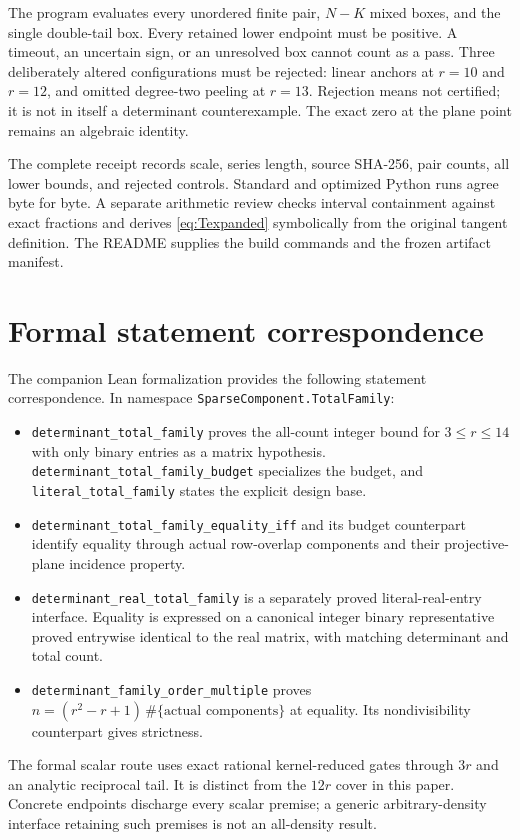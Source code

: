 \documentclass[11pt]{article}
\theoremstyle{remark}
\begin{document}
The program evaluates every unordered finite pair, $N-K$ mixed boxes, and
the single double-tail box. Every retained lower endpoint must be positive.
A timeout, an uncertain sign, or an unresolved box cannot count as a pass.
Three deliberately altered configurations must be rejected: linear anchors
at $r=10$ and $r=12$, and omitted degree-two peeling at $r=13$. Rejection
means not certified; it is not in itself a determinant counterexample.
The exact zero at the plane point remains an algebraic identity.

The complete receipt records scale, series length, source SHA-256, pair
counts, all lower bounds, and rejected controls. Standard and optimized
Python runs agree byte for byte. A separate arithmetic review checks interval
containment against exact fractions and derives \eqref{eq:Texpanded}
symbolically from the original tangent definition. The README supplies the
build commands and the frozen artifact manifest.

\section{Formal statement correspondence}
The companion Lean formalization provides the following statement correspondence.
In namespace
\texttt{SparseComponent.TotalFamily}:
\begin{itemize}
\item \texttt{determinant\_total\_family} proves the all-count integer bound
for $3\le r\le14$ with only binary entries as a matrix hypothesis.
\texttt{determinant\_total\_family\_budget} specializes the budget, and
\texttt{literal\_total\_family} states the explicit design base.
\item \texttt{determinant\_total\_family\_equality\_iff} and its budget
counterpart identify equality through actual row-overlap components and
their projective-plane incidence property.
\item \texttt{determinant\_real\_total\_family} is a separately proved
literal-real-entry interface. Equality is expressed on a canonical integer
binary representative proved entrywise identical to the real matrix, with
matching determinant and total count.
\item \texttt{determinant\_family\_order\_multiple} proves
$n=(r^2-r+1)\,\#\{\text{actual components}\}$ at equality. Its
nondivisibility counterpart gives strictness.
\end{itemize}
The formal scalar route uses exact rational kernel-reduced gates through
$3r$ and an analytic reciprocal tail. It is distinct from the $12r$ cover
in this paper. Concrete endpoints discharge every scalar premise; a generic
arbitrary-density interface retaining such premises is not an all-density
result.
\end{document}
